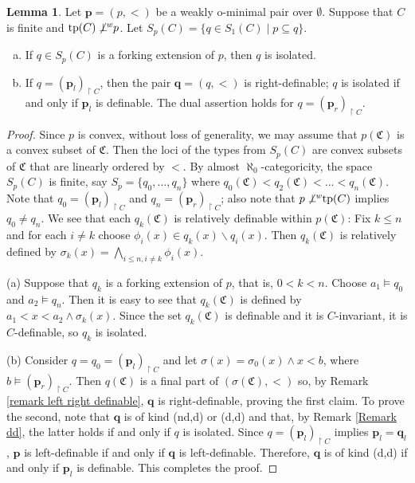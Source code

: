 \documentclass{amsart}
\theoremstyle{definition}
\newtheorem{Lemma}[Theorem]{Lemma}
\theoremstyle{definition}
\def\strok{\restriction}
\newcommand{\nwor}{\not\perp\hspace*{-0.4em}^{\mathit w}}
\newcommand{\Mon}{\mathfrak C}
\newcommand{\tp}{\mathrm{tp}}
\begin{document}
\begin{Lemma}\label{Lemma ALMOST isolation of extensionss}
Let $\mathbf p=(p,<)$ be a weakly o-minimal pair over $\emptyset$. Suppose that $C$ is finite and $\tp(C)\nwor p$. Let $S_p(C)=\{q\in S_1(C)\mid p\subseteq q\}$. 
    \begin{enumerate}[(a)]
       \item If $q\in S_p(C)$ is a forking extension of $p$, then $q$ is isolated.
       \item If $q=(\mathbf p_{l})_{\strok C}$, then the pair $\mathbf q=(q,<)$ is right-definable; $q$ is isolated if and only if $\mathbf p_l$ is definable. The dual assertion holds for $q=(\mathbf p_{r})_{\strok C}$.
    \end{enumerate}
\end{Lemma}
\begin{proof}Since $p$ is convex, without loss of generality, we may assume that $p(\Mon)$ is a convex subset of $\Mon$. Then the loci of the types from $S_p(C)$ are convex subsets of $\Mon$ that are linearly ordered by $<$. By almost $\aleph_0$-categoricity, the space $S_p(C)$ is finite, say $S_p=\{q_0,\dots,q_n\}$ where $q_0(\Mon)<q_2(\Mon)<\dots<q_n(\Mon)$. Note that $q_0=(\mathbf p_l)_{\strok C}$ and $q_n=(\mathbf p_r)_{\strok C}$; also note that $p\nwor \tp(C)$ implies $q_0\neq q_n$. We see that each $q_k(\Mon)$ is relatively definable within $p(\Mon)$: Fix $k\leqslant n$ and for each $i\neq k$ choose $\phi_i(x)\in q_k(x)\smallsetminus q_i(x)$. Then $q_k(\Mon)$ is relatively defined by $\sigma_k(x)=\bigwedge_{i\leqslant n,i\neq k}\phi_i(x)$. 

(a) Suppose that $q_k$ is a forking extension of $p$, that is, $0<k<n$. Choose $a_1\models q_0$ and $a_2\models q_n$. Then it is easy to see that $q_k(\Mon)$ is defined by $a_1<x<a_2\land \sigma_k(x)$. Since the set $q_k(\Mon)$ is definable and it is $C$-invariant, it is $C$-definable, so $q_k$ is isolated.   

(b) Consider $q=q_0=(\mathbf p_{l})_{\strok C}$ and let $\sigma(x)=\sigma_0(x)\land x<b$, where $b\models (\mathbf p_{r})_{\strok C}$. Then $q(\Mon)$ is a final part of $(\sigma(\Mon),<)$ so, by Remark \ref{remark left right definable}, $\mathbf q$ is right-definable, proving the first claim. To prove the second, note that $\mathbf q$ is of kind (nd,d) or (d,d) and that, by Remark \ref{Remark dd}, the latter holds if and only if $q$ is isolated. 
Since $q=(\mathbf p_{l})_{\strok C}$ implies $\mathbf p_l=\mathbf q_l$, $\mathbf p$ is left-definable if and only if $\mathbf q$ is left-definable. Therefore, $\mathbf q$ is of kind (d,d) if and only if 
$\mathbf p_l$ is definable. This completes the proof.   
\end{proof}
\end{document}
